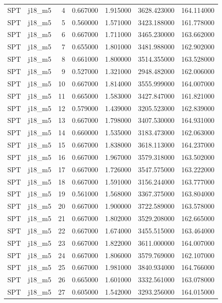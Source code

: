 \begin{tabular}{llrrrrr}
SPT & j18_m5 & 4 & 0.667000 & 1.915000 & 3628.423000 & 164.114000 \\
SPT & j18_m5 & 5 & 0.560000 & 1.571000 & 3423.188000 & 161.778000 \\
SPT & j18_m5 & 6 & 0.667000 & 1.711000 & 3465.230000 & 163.662000 \\
SPT & j18_m5 & 7 & 0.655000 & 1.801000 & 3481.988000 & 162.902000 \\
SPT & j18_m5 & 8 & 0.661000 & 1.800000 & 3514.355000 & 163.528000 \\
SPT & j18_m5 & 9 & 0.527000 & 1.321000 & 2948.482000 & 162.006000 \\
SPT & j18_m5 & 10 & 0.667000 & 1.814000 & 3555.999000 & 164.007000 \\
SPT & j18_m5 & 11 & 0.665000 & 1.583000 & 3427.847000 & 161.821000 \\
SPT & j18_m5 & 12 & 0.579000 & 1.439000 & 3205.523000 & 162.839000 \\
SPT & j18_m5 & 13 & 0.667000 & 1.798000 & 3407.530000 & 164.931000 \\
SPT & j18_m5 & 14 & 0.660000 & 1.535000 & 3183.473000 & 162.063000 \\
SPT & j18_m5 & 15 & 0.667000 & 1.838000 & 3618.113000 & 164.237000 \\
SPT & j18_m5 & 16 & 0.667000 & 1.967000 & 3579.318000 & 163.502000 \\
SPT & j18_m5 & 17 & 0.667000 & 1.726000 & 3547.575000 & 163.222000 \\
SPT & j18_m5 & 18 & 0.667000 & 1.591000 & 3156.244000 & 163.777000 \\
SPT & j18_m5 & 19 & 0.561000 & 1.568000 & 3367.375000 & 163.804000 \\
SPT & j18_m5 & 20 & 0.667000 & 1.900000 & 3722.589000 & 163.578000 \\
SPT & j18_m5 & 21 & 0.667000 & 1.802000 & 3529.208000 & 162.665000 \\
SPT & j18_m5 & 22 & 0.667000 & 1.674000 & 3455.515000 & 163.464000 \\
SPT & j18_m5 & 23 & 0.667000 & 1.822000 & 3611.000000 & 164.007000 \\
SPT & j18_m5 & 24 & 0.667000 & 1.806000 & 3579.769000 & 162.107000 \\
SPT & j18_m5 & 25 & 0.667000 & 1.981000 & 3840.934000 & 164.766000 \\
SPT & j18_m5 & 26 & 0.665000 & 1.601000 & 3332.561000 & 163.078000 \\
SPT & j18_m5 & 27 & 0.605000 & 1.542000 & 3293.256000 & 164.015000 \\

\end{tabular}
